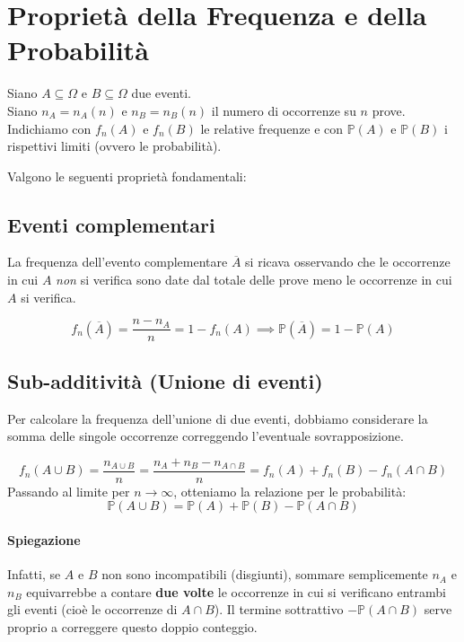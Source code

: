 \clearpage
\section{Proprietà della Frequenza e della Probabilità}

Siano $A \subseteq \Omega$ e $B \subseteq \Omega$ due eventi.
\\Siano $n_A = n_A(n)$ e $n_B = n_B(n)$ il numero di occorrenze su $n$ prove.
\\Indichiamo con $f_n(A)$ e $f_n(B)$ le relative frequenze e con $\mathbb{P}(A)$ e $\mathbb{P}(B)$ i rispettivi limiti (ovvero le probabilità).

Valgono le seguenti proprietà fondamentali:

\subsection{Eventi complementari}
La frequenza dell'evento complementare $\overline{A}$ si ricava osservando che le occorrenze in cui $A$ \emph{non} si verifica sono date dal totale delle prove meno le occorrenze in cui $A$ si verifica.

\[
f_n(\overline{A}) = \frac{n - n_A}{n} = 1 - f_n(A) \implies \mathbb{P}(\overline{A}) = 1 - \mathbb{P}(A)
\]

\subsection{Sub-additività (Unione di eventi)}
Per calcolare la frequenza dell'unione di due eventi, dobbiamo considerare la somma delle singole occorrenze correggendo l'eventuale sovrapposizione.

\[
f_n(A \cup B) = \frac{n_{A \cup B}}{n} = \frac{n_A + n_B - n_{A \cap B}}{n} = f_n(A) + f_n(B) - f_n(A \cap B)
\]
Passando al limite per $n \to \infty$, otteniamo la relazione per le probabilità:
\[
\mathbb{P}(A \cup B) = \mathbb{P}(A) + \mathbb{P}(B) - \mathbb{P}(A \cap B)
\]

\paragraph{Spiegazione}
Infatti, se $A$ e $B$ non sono incompatibili (disgiunti), sommare semplicemente $n_A$ e $n_B$ equivarrebbe a contare \textbf{due volte} le occorrenze in cui si verificano entrambi gli eventi (cioè le occorrenze di $A \cap B$). Il termine sottrattivo $-\mathbb{P}(A \cap B)$ serve proprio a correggere questo doppio conteggio.


